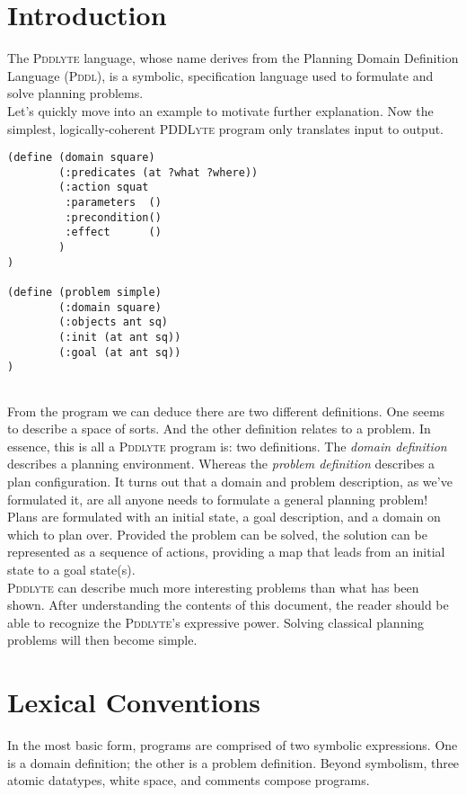 \documentclass[
a4paper, %
11pt, %
onecolumn, %
openany, %
]{memoir}
\begin{document}
\tableofcontents*
\clearpage


\chapter{Introduction}
{\setlength{\parindent}{0cm}
The \textsc{Pddlyte} language, whose name derives from the Planning Domain Definition Language (\textsc{Pddl})\cite{pddl98}, is a symbolic, specification language used to formulate and solve planning problems.\\
 
Let's quickly move into an example to motivate further explanation. Now the simplest, logically-coherent \textsc{PDDLyte} program only translates input to output.\\

}
\begin{lstlisting}
(define (domain square)
        (:predicates (at ?what ?where))
        (:action squat
         :parameters  ()
         :precondition()
         :effect      ()
        )
)

(define (problem simple)
        (:domain square)
        (:objects ant sq)
        (:init (at ant sq))
        (:goal (at ant sq))
)
        
\end{lstlisting}

\noindent From the program we can deduce there are two different definitions. One seems to describe a space of sorts. And the other definition relates to a problem. In essence, this is all a \textsc{Pddlyte} program is: two definitions. The \textit{domain definition} describes a planning environment. Whereas the \textit{problem definition} describes a plan configuration. It turns out that a domain and problem description, as we've formulated it, are all anyone needs to formulate a general planning problem! Plans are formulated with an initial state, a goal description, and a domain on which to plan over. Provided the problem can be solved, the solution can be represented as a sequence of actions, providing a map that leads from an initial state to a goal state(s).\\

\noindent \textsc{Pddlyte} can describe much more interesting problems than what has been shown. After understanding the contents of this document, the reader should be able to recognize the \textsc{Pddlyte}'s expressive power. Solving classical planning problems will then become simple.

\chapter{Lexical Conventions}
{\setlength{\parindent}{0cm}
In the most basic form, programs are comprised of two symbolic expressions. One is a domain definition; the other is a problem definition. Beyond symbolism, three atomic datatypes, white space, and comments compose programs.
}
\end{document}
